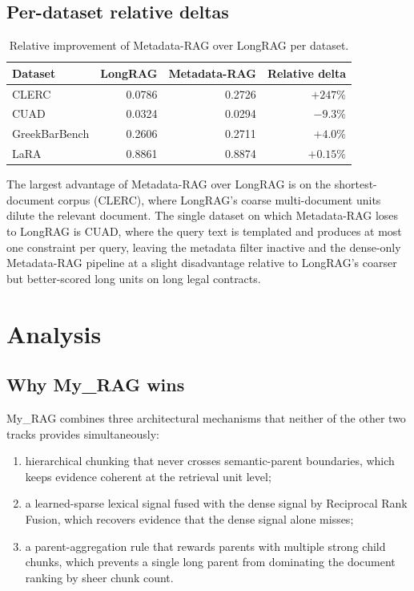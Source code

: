 \documentclass[11pt,a4paper]{article}
\begin{document}
\subsection{Per-dataset relative deltas}
\begin{table}[h]
\centering
\caption{Relative improvement of Metadata-RAG over LongRAG per
dataset.}
\label{tab:relativedelta}
\small
\begin{tabular}{l r r r}
\toprule
\textbf{Dataset} & \textbf{LongRAG} & \textbf{Metadata-RAG}
  & \textbf{Relative delta} \\
\midrule
CLERC              & \num{0.0786} & \num{0.2726} & $+247\%$ \\
CUAD               & \num{0.0324} & \num{0.0294} & $-9.3\%$ \\
GreekBarBench      & \num{0.2606} & \num{0.2711} & $+4.0\%$ \\
LaRA               & \num{0.8861} & \num{0.8874} & $+0.15\%$ \\
\bottomrule
\end{tabular}
\end{table}

The largest advantage of Metadata-RAG over LongRAG is on the
shortest-document corpus (CLERC), where LongRAG's coarse
multi-document units dilute the relevant document. The single
dataset on which Metadata-RAG loses to LongRAG is CUAD, where the
query text is templated and produces at most one constraint per
query, leaving the metadata filter inactive and the dense-only
Metadata-RAG pipeline at a slight disadvantage relative to LongRAG's
coarser but better-scored long units on long legal contracts.

\section{Analysis}\label{sec:analysis}

\subsection{Why My\_RAG wins}
My\_RAG combines three architectural mechanisms that neither of the
other two tracks provides simultaneously:

\begin{enumerate}[leftmargin=1.5em,itemsep=0.15em]
  \item hierarchical chunking that never crosses semantic-parent
    boundaries, which keeps evidence coherent at the retrieval unit
    level;
  \item a learned-sparse lexical signal fused with the dense signal
    by Reciprocal Rank Fusion, which recovers evidence that the
    dense signal alone misses;
  \item a parent-aggregation rule that rewards parents with multiple
    strong child chunks, which prevents a single long parent from
    dominating the document ranking by sheer chunk count.
\end{enumerate}
\end{document}
